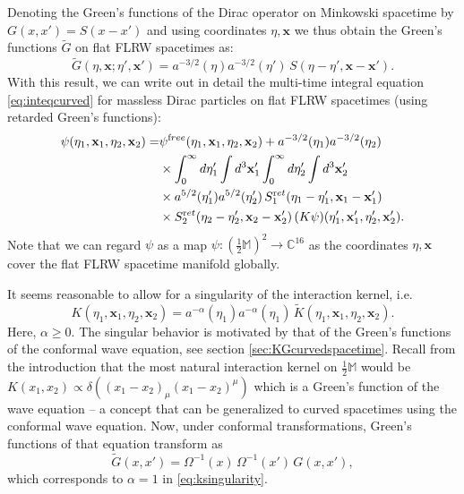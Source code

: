 \documentclass[b5paper,draft,openbib,12pt]{memoir}
\newcommand{\CC}{\mathbb{C}}
\newcommand{\M}{\mathbb{M}}
\newcommand{\vx}{\mathbf{x}}
\newcommand{\ret}{{\textup ret}}
\newcommand{\free}{{\textup free}}
\begin{document}
Denoting the Green's functions of the Dirac operator on Minkowski 
spacetime by $G(x,x')=S(x-x')$ and using coordinates $\eta, \vx$ 
we thus obtain the Green's functions $\widetilde{G}$ on flat FLRW 
spacetimes as:
\begin{equation}
	\widetilde{G}(\eta,\vx; \eta', \vx') = a^{-3/2}(\eta) a^{-3/2}(\eta')\, S(\eta-\eta', \vx-\vx').
\end{equation}
With this result, we can write out in detail the multi-time integral 
equation \eqref{eq:inteqcurved} for massless Dirac particles on flat 
FLRW spacetimes (using retarded Green's functions):
\begin{align}\nonumber
  \psi(\eta_1,\vx_1,\eta_2,\vx_2) =& \psi^\free(\eta_1,\vx_1,\eta_2,\vx_2) + a^{-3/2}(\eta_1) a^{-3/2}(\eta_2) \\
  &\times \int_0^\infty d \eta_1' \int d^3 \vx_1' \int_0^\infty d \eta_2' \int d^3 \vx_2' \nonumber\\
  &\times a^{5/2}(\eta_1') a^{5/2}(\eta_2') \, S_1^\ret(\eta_1-\eta_1', \vx_1-\vx_1')\\
  &\times S_2^\ret(\eta_2-\eta_2',\vx_2-\vx_2') \, (K \psi)(\eta_1',\vx_1',\eta_2',\vx_2').
\end{align}
Note that we can regard $\psi$ as a map 
$\psi : (\frac{1}{2}\M)^2 \rightarrow \CC^{16}$ as the coordinates 
$\eta, \vx$ cover the flat FLRW spacetime manifold globally.

It seems reasonable to allow for a singularity of the interaction 
kernel, i.e.\
\begin{equation}
	K(\eta_1,\vx_1,\eta_2,\vx_2) = a^{-\alpha}(\eta_1)  a^{-\alpha}(\eta_1) \, \widetilde{K}(\eta_1,\vx_1,\eta_2,\vx_2).
	\label{eq:ksingularity}
\end{equation}
Here, $\alpha \geq 0$. The singular behavior is motivated by that of 
the Green's functions of the conformal wave equation, 
see section \ref{sec:KGcurvedspacetime}. 
Recall from the introduction that the most 
natural interaction kernel on $\frac{1}{2}\M$ would be 
$K(x_1,x_2)\propto \delta((x_1-x_2)_\mu(x_1-x_2)^\mu)$ which is a 
Green's function of the wave equation -- a concept that can be 
generalized to curved spacetimes using the conformal wave equation. 
Now, under conformal transformations, Green's functions of that 
equation transform as \cite{john}
\begin{equation}
	\widetilde{G}(x,x') = \Omega^{-1}(x) \,\Omega^{-1}(x') \, G(x,x'),
\end{equation}
which corresponds to $\alpha = 1$ in \eqref{eq:ksingularity}.
\end{document}
